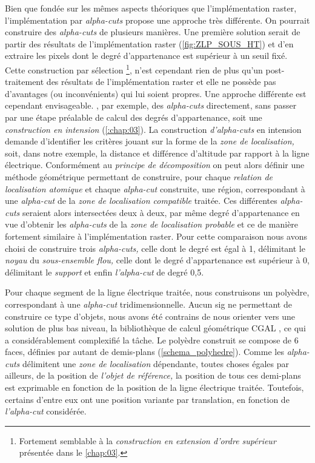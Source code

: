 Bien que fondée sur les mêmes aspects théoriques que l'implémentation raster, l'implémentation par \emph{alpha-cuts} propose une approche très différente. On pourrait construire des \emph{alpha-cuts} de plusieurs manières. Une première solution serait de partir des résultats de l'implémentation raster (\autoref{fig:ZLP_SOUS_HT}) et d'en extraire les pixels dont le degré d'appartenance est supérieur à un seuil fixé. Cette construction par sélection \footnote{Fortement semblable à la \emph{construction en extension d'ordre supérieur} présentée dans le \autoref{chap:03}.}, n'est cependant rien de plus qu'un post-traitement des résultats de l'implémentation raster et elle ne possède pas d'avantages (ou inconvénients) qui lui soient propres. Une approche différente est cependant envisageable. \textcite{Runz2008a, Zoghlami2016}, par exemple, des \emph{alpha-cuts} directement, sans passer par une étape préalable de calcul des degrés d'appartenance, soit une \emph{construction en intension} (\autoref{:chap:03}). La construction \emph{d'alpha-cuts} en intension demande d'identifier les critères jouant sur la forme de la \emph{zone de localisation,} soit, dans notre exemple, la distance et différence d'altitude par rapport à la ligne électrique. Conformément au \emph{principe de décomposition} on peut alors définir une méthode géométrique permettant de construire, pour chaque \emph{relation de localisation atomique} et chaque \emph{alpha-cut} construite, une région, correspondant à une \emph{alpha-cut} de la \emph{zone de localisation compatible} traitée. Ces différentes \emph{alpha-cuts} seraient alors intersectées deux à deux, par même degré d'appartenance en vue d'obtenir les \emph{alpha-cuts} de la \emph{zone de localisation probable} et ce de manière fortement similaire à l'implémentation raster. Pour cette comparaison nous avons choisi de construire trois \emph{alpha-cuts,} celle dont le degré est égal à 1, délimitant le \emph{noyau} du \emph{sous-ensemble flou,} celle dont le degré d'appartenance est supérieur à 0, délimitant le \emph{support} et enfin \emph{l'alpha-cut} de degré 0,5.

Pour chaque segment de la ligne électrique traitée, nous construisons
un polyèdre, correspondant à une \emph{alpha-cut}
tridimensionnelle. Aucun \ac{sig} ne permettant de construire ce type
d'objets, nous avons été contrains de nous orienter vers une solution
de plus bas niveau, la bibliothèque de calcul géométrique CGAL
\autocite{CGAL2019}, ce qui a considérablement complexifié la
tâche. Le polyèdre construit se compose de 6 faces, définies par
autant de demis-plans (\autoref{schema_polyhedre}). Comme les
\emph{alpha-cuts} délimitent une \emph{zone de localisation}
dépendante, toutes choses égales par ailleurs, de la position de
\emph{l'objet de référence,} la position de tous ces demi-plans est
exprimable en fonction de la position de la ligne électrique
traitée. Toutefois, certains d'entre eux ont une position variante par
translation, en fonction de \emph{l'alpha-cut} considérée.

